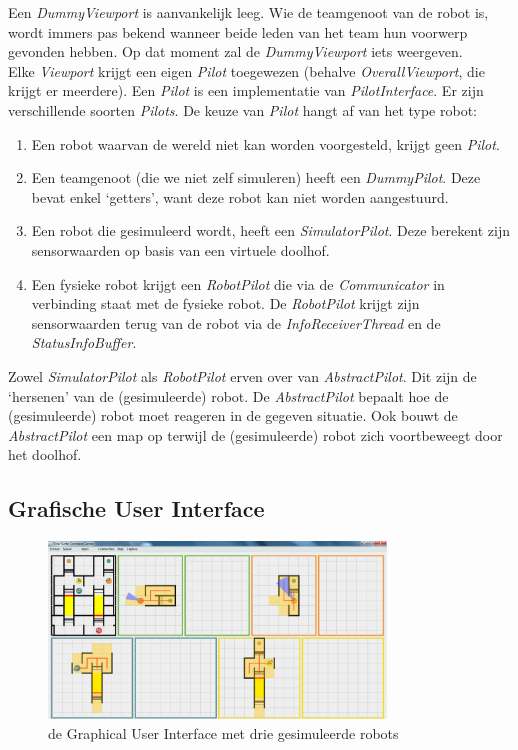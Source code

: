 \documentclass[eind]{penoverslag}
\begin{document}
Een \textit{DummyViewport} is aanvankelijk leeg. Wie de teamgenoot van de robot is, wordt immers pas bekend wanneer beide leden van het team hun voorwerp gevonden hebben. Op dat moment zal de \textit{DummyViewport} iets weergeven.\\

Elke \textit{Viewport} krijgt een eigen \textit{Pilot} toegewezen (behalve \textit{OverallViewport}, die krijgt er meerdere). Een \textit{Pilot} is een implementatie van \textit{PilotInterface}. Er zijn verschillende soorten \textit{Pilots}. De keuze van \textit{Pilot} hangt af van het type robot:

\begin{enumerate}
	\item Een robot waarvan de wereld niet kan worden voorgesteld, krijgt geen \textit{Pilot}.
	\item Een teamgenoot (die we niet zelf simuleren) heeft een \textit{DummyPilot}. Deze bevat enkel `getters', want deze robot kan niet worden aangestuurd.
	\item Een robot die gesimuleerd wordt, heeft een \textit{SimulatorPilot}. Deze berekent zijn sensorwaarden op basis van een virtuele doolhof.
	\item Een fysieke robot krijgt een \textit{RobotPilot} die via de \textit{Communicator} in verbinding staat met de fysieke robot. De \textit{RobotPilot} krijgt zijn sensorwaarden terug van de robot via de \textit{InfoReceiverThread} en de \textit{StatusInfoBuffer}.
\end{enumerate}

Zowel \textit{SimulatorPilot} als \textit{RobotPilot} erven over van \textit{AbstractPilot}. Dit zijn de `hersenen' van de (gesimuleerde) robot. De \textit{AbstractPilot} bepaalt hoe de (gesimuleerde) robot moet reageren in de gegeven situatie. Ook bouwt de \textit{AbstractPilot} een map op terwijl de (gesimuleerde) robot zich voortbeweegt door het doolhof.

\subsection{Grafische User Interface}
\label{ssec:GUI}

\begin{figure}[h]
\centering
	\includegraphics[width=0.8\textwidth]{gui}
\caption{de Graphical User Interface met drie gesimuleerde robots}
\label{fig:GUI1}
\end{figure}
\end{document}
